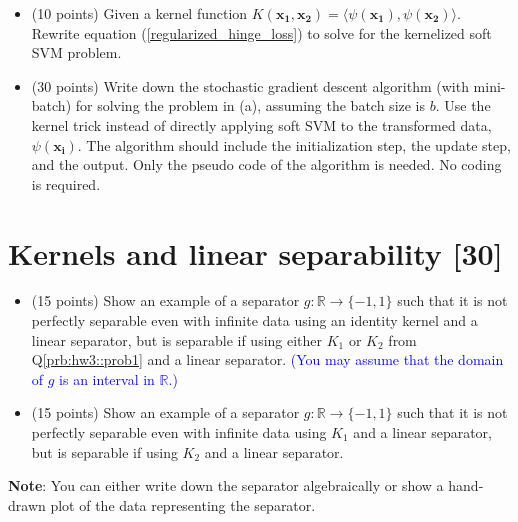 \begin{itemize}[(a)]
    \item (10 points) Given a kernel function $K(\bm{x_1},\bm{x_2}) = \langle \psi(\bm{x_1}),\psi(\bm{x_2})\rangle$. Rewrite equation (\ref{regularized_hinge_loss}) to solve for the kernelized soft SVM problem.
\end{itemize}  
\begin{itemize}[(b)]
    \item (30 points) Write down the stochastic gradient descent algorithm (with mini-batch) for solving the problem in (a), assuming the batch size is $b$. Use the kernel trick instead of directly applying soft SVM to the transformed data, $\psi(\bm{x_i})$. The algorithm should include the initialization step, the update step, and the output. Only the pseudo code of the algorithm is needed. No coding is required.
\end{itemize}  
\label{prb:hw3::prob2}



\newpage
\section{Kernels and linear separability [30]}
\label{prb:hw3::prob3}
\begin{itemize}[(a)]
    \item (15 points) Show an example of a separator $g: \mathbb{R} \rightarrow \{-1,1\}$ such that it is not perfectly separable even with infinite data using an identity kernel and a linear separator, but is separable if using either $K_1$ or $K_2$ from Q\ref{prb:hw3::prob1} and a linear separator. \textcolor{blue}{(You may assume that the domain of $g$ is an interval in $\mathbb{R}$.)}
\end{itemize} 

\begin{itemize}[(b)]
    \item (15 points) Show an example of a separator $g: \mathbb{R} \rightarrow \{-1,1\}$ such that it is not perfectly separable even with infinite data using $K_1$ and a linear separator, but is separable if using $K_2$ and a linear separator. 
\end{itemize} 

\noindent \textbf{Note}: You can either write down the separator algebraically or show a hand-drawn plot of the data representing the separator.
